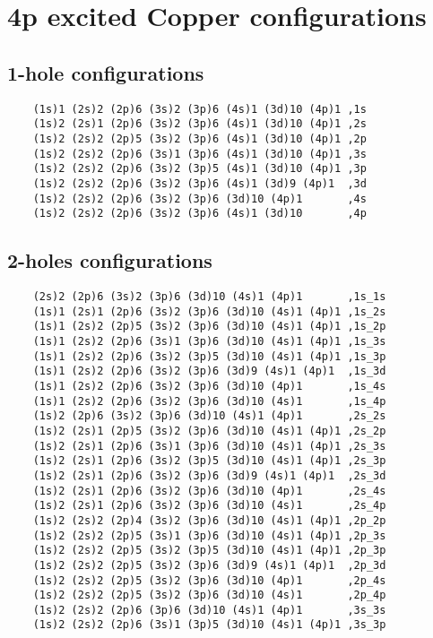 
%

\chapter{4p excited Copper configurations}
\label{an:confs}
\section{1-hole configurations}
\begin{lstlisting}
    (1s)1 (2s)2 (2p)6 (3s)2 (3p)6 (4s)1 (3d)10 (4p)1 ,1s
    (1s)2 (2s)1 (2p)6 (3s)2 (3p)6 (4s)1 (3d)10 (4p)1 ,2s
    (1s)2 (2s)2 (2p)5 (3s)2 (3p)6 (4s)1 (3d)10 (4p)1 ,2p
    (1s)2 (2s)2 (2p)6 (3s)1 (3p)6 (4s)1 (3d)10 (4p)1 ,3s
    (1s)2 (2s)2 (2p)6 (3s)2 (3p)5 (4s)1 (3d)10 (4p)1 ,3p
    (1s)2 (2s)2 (2p)6 (3s)2 (3p)6 (4s)1 (3d)9 (4p)1  ,3d
    (1s)2 (2s)2 (2p)6 (3s)2 (3p)6 (3d)10 (4p)1       ,4s
    (1s)2 (2s)2 (2p)6 (3s)2 (3p)6 (4s)1 (3d)10       ,4p    
\end{lstlisting}
\section{2-holes configurations}
\begin{lstlisting}
    (2s)2 (2p)6 (3s)2 (3p)6 (3d)10 (4s)1 (4p)1       ,1s_1s
    (1s)1 (2s)1 (2p)6 (3s)2 (3p)6 (3d)10 (4s)1 (4p)1 ,1s_2s
    (1s)1 (2s)2 (2p)5 (3s)2 (3p)6 (3d)10 (4s)1 (4p)1 ,1s_2p
    (1s)1 (2s)2 (2p)6 (3s)1 (3p)6 (3d)10 (4s)1 (4p)1 ,1s_3s
    (1s)1 (2s)2 (2p)6 (3s)2 (3p)5 (3d)10 (4s)1 (4p)1 ,1s_3p
    (1s)1 (2s)2 (2p)6 (3s)2 (3p)6 (3d)9 (4s)1 (4p)1  ,1s_3d
    (1s)1 (2s)2 (2p)6 (3s)2 (3p)6 (3d)10 (4p)1       ,1s_4s
    (1s)1 (2s)2 (2p)6 (3s)2 (3p)6 (3d)10 (4s)1       ,1s_4p
    (1s)2 (2p)6 (3s)2 (3p)6 (3d)10 (4s)1 (4p)1       ,2s_2s
    (1s)2 (2s)1 (2p)5 (3s)2 (3p)6 (3d)10 (4s)1 (4p)1 ,2s_2p
    (1s)2 (2s)1 (2p)6 (3s)1 (3p)6 (3d)10 (4s)1 (4p)1 ,2s_3s
    (1s)2 (2s)1 (2p)6 (3s)2 (3p)5 (3d)10 (4s)1 (4p)1 ,2s_3p
    (1s)2 (2s)1 (2p)6 (3s)2 (3p)6 (3d)9 (4s)1 (4p)1  ,2s_3d
    (1s)2 (2s)1 (2p)6 (3s)2 (3p)6 (3d)10 (4p)1       ,2s_4s
    (1s)2 (2s)1 (2p)6 (3s)2 (3p)6 (3d)10 (4s)1       ,2s_4p
    (1s)2 (2s)2 (2p)4 (3s)2 (3p)6 (3d)10 (4s)1 (4p)1 ,2p_2p
    (1s)2 (2s)2 (2p)5 (3s)1 (3p)6 (3d)10 (4s)1 (4p)1 ,2p_3s
    (1s)2 (2s)2 (2p)5 (3s)2 (3p)5 (3d)10 (4s)1 (4p)1 ,2p_3p
    (1s)2 (2s)2 (2p)5 (3s)2 (3p)6 (3d)9 (4s)1 (4p)1  ,2p_3d
    (1s)2 (2s)2 (2p)5 (3s)2 (3p)6 (3d)10 (4p)1       ,2p_4s
    (1s)2 (2s)2 (2p)5 (3s)2 (3p)6 (3d)10 (4s)1       ,2p_4p
    (1s)2 (2s)2 (2p)6 (3p)6 (3d)10 (4s)1 (4p)1       ,3s_3s
    (1s)2 (2s)2 (2p)6 (3s)1 (3p)5 (3d)10 (4s)1 (4p)1 ,3s_3p

\end{lstlisting}


